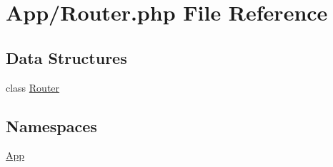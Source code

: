 \hypertarget{_router_8php}{}\section{App/\+Router.php File Reference}
\label{_router_8php}
\subsection*{Data Structures}
\begin{DoxyCompactItemize}
\item 
class \hyperlink{class_app_1_1_router}{Router}
\end{DoxyCompactItemize}
\subsection*{Namespaces}
\begin{DoxyCompactItemize}
\item 
 \hyperlink{namespace_app}{App}
\end{DoxyCompactItemize}
